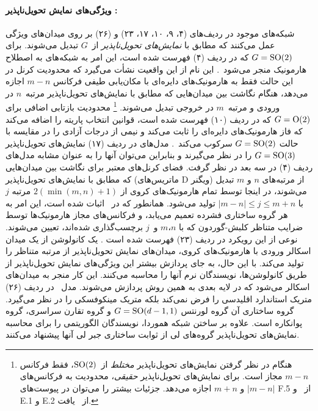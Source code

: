 \paragraph{ویژگی‌های نمایش تحویل‌ناپذیر :}
شبکه‌های موجود در ردیف‌های (۴، ۹، ۱۰، ۱۷، ۲۳) و (۲۶) بر روی میدان‌های ویژگی عمل می‌کنند که مطابق با \emph{نمایش‌های تحویل‌ناپذیر}  از~$G$ تبدیل می‌شوند.
برای $G=\operatorname{SO}(2)$ که در ردیف (۴) فهرست شده است، این امر به شبکه‌های به اصطلاح هارمونیک منجر می‌شود~\cite{Worrall2017-HNET,Weiler2019_E2CNN}.
این نام از این واقعیت نشأت می‌گیرد که محدودیت کرنل در این حالت فقط به هارمونیک‌های دایره‌ای با مکان‌یابی طیفی فرکانس $m-n$ اجازه می‌دهد، هنگام نگاشت بین میدان‌هایی که مطابق با نمایش‌های تحویل‌ناپذیر مرتبه~$n$ در ورودی و مرتبه~$m$ در خروجی تبدیل می‌شوند.%
\footnote{
	هنگام در نظر گرفتن نمایش‌های تحویل‌ناپذیر \emph{مختلط} از~$\operatorname{SO}(2)$، فقط فرکانس $m-n$ مجاز است.
	برای نمایش‌های تحویل‌ناپذیر \emph{حقیقی}، محدودیت به فرکانس‌های $|m-n|$ و $m+n$ اجازه می‌دهد.
	جزئیات بیشتر را می‌توان در پیوست‌های F.5 از~\cite{Weiler2019_E2CNN} و E.1 و E.2 از~\cite{lang2020WignerEckart} یافت.
}
محدودیت بازتابی اضافی برای $G=\operatorname{O}(2)$ که در ردیف (۱۰) فهرست شده است، قوانین انتخاب پاریته را اضافه می‌کند که فاز هارمونیک‌های دایره‌ای را ثابت می‌کند و نیمی از درجات آزادی را در مقایسه با حالت $G=\operatorname{SO}(2)$ سرکوب می‌کند~\cite{Weiler2019_E2CNN}.
مدل‌های \cite{3d_steerableCNNs,Thomas2018-TFN,miller2020relevance,Kondor2018-NBN,anderson2019cormorant} در ردیف (۱۷) نمایش‌های تحویل‌ناپذیر $G=\operatorname{SO}(3)$ را در نظر می‌گیرند و بنابراین می‌توان آنها را به عنوان مشابه مدل‌های ردیف (۴) در سه بعد در نظر گرفت.
فضای کرنل‌های معتبر برای نگاشت بین میدان‌هایی که مطابق با نمایش‌های تحویل‌ناپذیر (ماتریس‌های D ویگنر) از مرتبه‌های $n$ و $m$ تبدیل می‌شوند، در اینجا توسط تمام هارمونیک‌های کروی از $2(\min(m,n)+1)$ مرتبه $j$ با $|m-n| \leq j \leq m+n$ تولید می‌شود.
همانطور که در~\cite{lang2020WignerEckart} اثبات شده است، این امر به هر گروه ساختاری فشرده تعمیم می‌یابد، و فرکانس‌های مجاز هارمونیک‌ها توسط ضرایب متناظر کلبش-گوردون که با $m، n$ و~$j$ برچسب‌گذاری شده‌اند، تعیین می‌شوند.
نوعی از این رویکرد در ردیف (۲۳) فهرست شده است \cite{poulenard2019effective}.
یک کانولوشن از یک میدان اسکالر ورودی با هارمونیک‌های کروی، میدان‌های نمایش تحویل‌ناپذیر از مرتبه متناظر را تولید می‌کند.
با این حال، به جای پردازش بیشتر این ویژگی‌های نمایش تحویل‌ناپذیر از طریق کانولوشن‌ها، نویسندگان نرم آنها را محاسبه می‌کنند.
این کار منجر به میدان‌های اسکالر می‌شود که در لایه بعدی به همین روش پردازش می‌شوند.
مدل~\cite{shutty2020learning} در ردیف (۲۶) متریک استاندارد اقلیدسی را فرض نمی‌کند بلکه متریک مینکوفسکی را در نظر می‌گیرد.
گروه ساختاری آن گروه لورنتس $G=\operatorname{SO}(d-1,1)$ و گروه تقارن سراسری، گروه پوانکاره است.
علاوه بر ساختن شبکه هموردا، نویسندگان الگوریتمی را برای محاسبه نمایش‌های تحویل‌ناپذیر گروه‌های لی از ثوابت ساختاری جبر لی آنها پیشنهاد می‌کنند.


